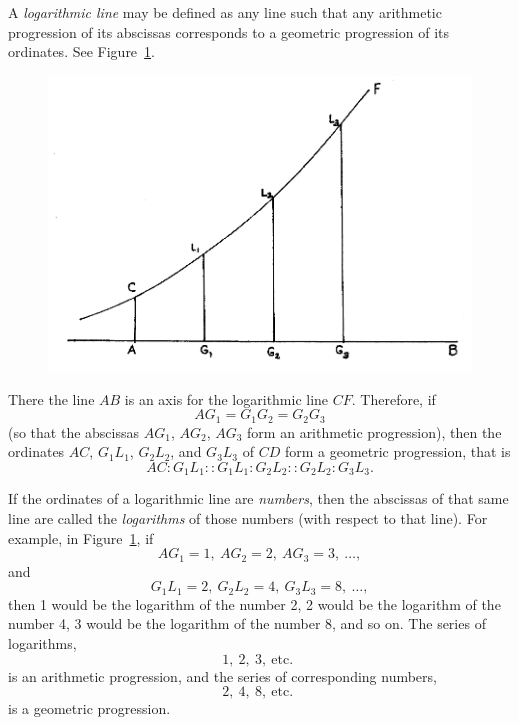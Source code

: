 \documentclass[twoside,openright]{article}
\begin{document}
A {\em logarithmic line}\label{logdef} may be defined as any line
such that any arithmetic progression of its abscissas corresponds to a
geometric progression of its ordinates.  See Figure~\ref{logs}.
\begin{figure}[htp]
\begin{center}
\includegraphics[width=\textwidth]{fig/Figure27A}
\caption{}
\label{logs}
\vspace{-10pt}
\end{center}
\end{figure}
  There the line $AB$ is an axis for the logarithmic line $CF$.  Therefore, if 
$$AG_1 = G_1G_2 = G_2G_3$$
(so that the abscissas $AG_1$, $AG_2$, $AG_3$ form an arithmetic progression),
 then the ordinates $AC$, $G_1L_1$, $G_2L_2$, and $G_3L_3$ of $CD$ form a geometric progression, that is
$$AC\!:\! G_1L_1 :: G_1L_1 \!:\! G_2L_2 :: G_2L_2 \!:\! G_3L_3.$$

If the ordinates of a logarithmic line are {\em numbers}, then the
abscissas of that same line are called the {\em logarithms} of those
numbers (with respect to that line).  For example, in
Figure~\ref{logs}, if
$$AG_1 = 1,\ AG_2 = 2,\ AG_3 = 3,\ \ldots,$$
and
$$G_1L_1 = 2,\ G_2L_2 = 4,\ G_3L_3 = 8,\ \ldots,$$
then 1 would be the logarithm of the number 2, 2 would be the
logarithm of the number 4, 3 would be the logarithm of the number 8,
and so on.  The series of logarithms,
$$1,\ 2,\ 3,\ \mbox{etc. }$$
is an arithmetic progression, and the series of corresponding numbers,
$$2,\ 4,\ 8,\ \mbox{etc. }$$
is a geometric progression.
\end{document}
